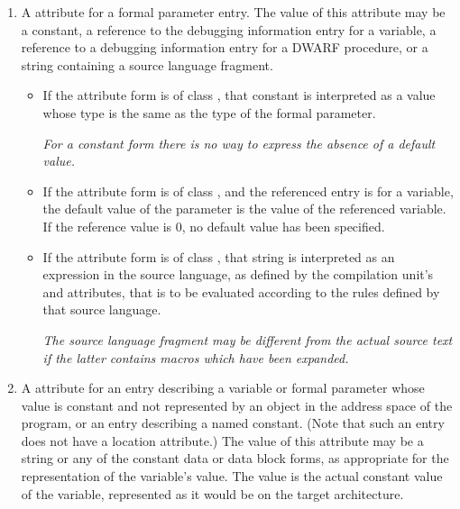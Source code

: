 \begin{enumerate}[1. ]
\item \hypertarget{chap:DWATdefaultvaluedefaultvalueofparameter}{}
A \DWATdefaultvalueDEFN{} attribute
for 
a formal parameter entry.
The value of this attribute may be a constant,
\db
a reference to the debugging information entry for a variable,
\db
a reference to a debugging information entry
\bb
for a DWARF procedure,
or a string containing a source language fragment.
\eb
\begin{itemize}
\item
If the attribute form is of class \CLASSconstant, that constant is
interpreted as a value whose type is the same as
the type of the formal parameter.

\bb
\textit{For a constant form there is no way to
express the absence of a default value.}
\eb

\item
If the attribute
form is of class \CLASSreference, and the referenced entry is for a
variable, the default value of the parameter is the value of the
referenced variable.  If the reference value is 0, no default value
has been specified.

\db
\item
\bb
If the attribute form is of class \CLASSstring, that string is interpreted
as an expression in the source language, as defined by the compilation
unit's \DWATlanguagename{} and \DWATlanguageversion{} attributes, that is
to be evaluated according to the rules defined by that source language.

\textit{The source language fragment may be different from the actual source
text if the latter contains macros which have been expanded.}
\eb
\end{itemize}
\db
\item \hypertarget{chap:DWATconstvalueconstantobject}{}
A \DWATconstvalueDEFN{} attribute
for an entry describing a
variable or formal parameter whose value is constant and not
represented by an object in the address space of the program,
or an entry describing a named constant. (Note that such
an entry does not have a location attribute.) The value of
this attribute may be a string or any of the constant data
or data block forms,
as appropriate for the representation
of the variable's value. The value is the actual constant
value of the variable, represented as it would be on the
target architecture.


\end{enumerate}
